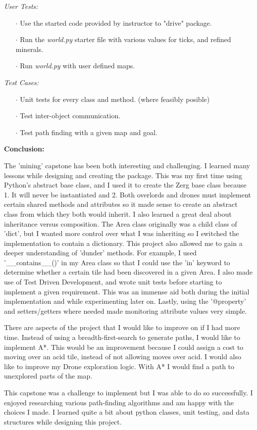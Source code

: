 \documentclass{article}
\begin{document}
\textit{User Tests:}
\begin{itemize}
	\item[$\cdot$] Use the started code provided by instructor to "drive"
	package.
	\item[$\cdot$]Run the \textit{world.py} starter file with various
	values for ticks, and refined minerals.
	\item[$\cdot$] Run \textit{world.py} with user defined maps.
\end{itemize}

\textit{Test Cases:}
\begin{itemize}
	\item[$\cdot$] Unit tests for every class and method. (where feasibly 
	posible)
	\item[$\cdot$] Test inter-object communication.
	\item[$\cdot$] Test path finding with a given map and goal.
\end{itemize}
\vspace{.5pc}

\begin{flushleft}
\textbf{Conclusion:}
\vspace{.5pc}
\end{flushleft}

The 'mining' capstone has been both interesting and challenging.  I learned 
many lessons while designing and creating the package.  This was my first 
time using Python's abstract base class, and I used it to create the Zerg
base class because 1. It will never be instantiated and 2. Both overlords and 
drones must implement certain shared methods and attributes so it made sense
to create an abstract class from which they both would inherit.  I also 
learned a great deal about inheritance versus composition.  The Area class
originally was a child class of 'dict', but I wanted more control over what
I was inheriting so I switched the implementation to contain a dictionary.  
This project also allowed me to gain a deeper understanding of 'dunder' 
methods.  For example, I used '\_\_contains\_\_()' in my Area class so that I 
could use the 'in' keyword to determine whether a certain tile had been 
discovered in a given Area.  I also made use of Test Driven Development, and 
wrote unit tests before starting to implement a given requirement.  This was
an immense aid both during the initial implementation and while experimenting
later on.  Lastly, using the '@property' and setters/getters where needed 
made monitoring attribute values very simple.

There are aspects of the project that I would like to improve on if I had 
more time.  Instead of using a breadth-first-search to generate paths, I 
would like to implement A*.  This would be an improvement because I could
assign a cost to moving over an acid tile, instead of not allowing moves over
acid.  I would also like to improve my Drone exploration logic.  With A* I 
would find a path to unexplored parts of the map.  

This capstone was a challenge to implement but I was able to do so 
successfully.  I enjoyed researching various path-finding algorithms and am
happy with the choices I made.  I learned quite a bit about python classes,
unit testing, and data structures while designing this project.
\end{document}
